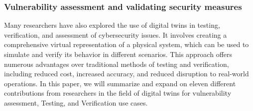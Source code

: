 
\subsubsection{Vulnerability assessment and validating security measures}

Many researchers have also explored the use of digital twins in testing, verification, and assessment of cybersecurity issues. It involves creating a comprehensive virtual representation of a physical system, which can be used to simulate and verify its behavior in different scenarios. This approach offers numerous advantages over traditional methods of testing and verification, including reduced cost\cite{franciaDigitalTwinsIndustrial2021, jiaqiliSpaceSpiderHyper2022, shitoleRealTimeDigitalTwin2021, maillet-contozEndtoendSecurityValidation2020}, increased accuracy\cite{sugumarAssessmentMethodDetecting2019, atalayDigitalTwinsApproach2020}, and reduced disruption \cite{franciaDigitalTwinsIndustrial2021, atalayDigitalTwinsApproach2020, adrienbacueDigitalTwinsEnhanced2022} to real-world operations.  
In this paper, we will summarize and expand on eleven different contributions from researchers in the field of digital twins for vulnerability assessment, Testing, and Verification use cases.  



